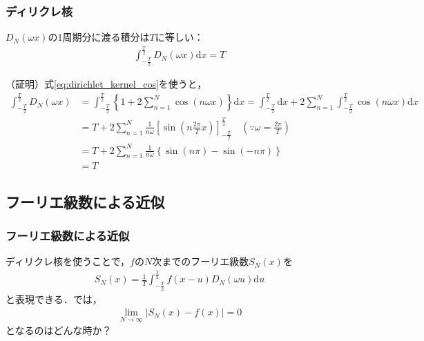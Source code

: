 \documentclass[dvipdfmx,graphicx,14pt]{beamer}
\begin{document}
\begin{frame}[c]
    \frametitle{ディリクレ核}
    \begin{block}{}
        $D_{N}(\omega x)$の1周期分に渡る積分は$T$に等しい：
        \begin{align}
            \int_{-\frac{T}{2}}^{\frac{T}{2}} D_{N}(\omega x) \mathrm{d} x = T \label{eq:dirichlet_kernel_int_period}
        \end{align}
    \end{block}
    \scriptsize
    （証明）式\eqref{eq:dirichlet_kernel_cos}を使うと，
    \begin{align*}
        \int_{-\frac{T}{2}}^{\frac{T}{2}} D_{N}(\omega x) &= \int_{-\frac{T}{2}}^{\frac{T}{2}} \left\{ 1 + 2 \sum_{n = 1}^{N} \cos(n\omega x) \right\} \mathrm{d} x = \int_{-\frac{T}{2}}^{\frac{T}{2}} \mathrm{d} x + 2 \sum_{n = 1}^{N} \int_{-\frac{T}{2}}^{\frac{T}{2}} \cos(n\omega x) \mathrm{d} x \\
        &= T + 2 \sum_{n = 1}^{N} \frac{1}{n\omega} \left[ \sin\left(n\frac{2\pi}{T} x\right) \right]_{-\frac{T}{2}}^{\frac{T}{2}} \quad \left(\because \omega = \frac{2\pi}{T}\right) \\
        &= T + 2 \sum_{n = 1}^{N} \frac{1}{n\omega} \left\{ \sin(n \pi) - \sin(-n \pi) \right\} \\
        &= T
    \end{align*}
\end{frame}

\subsection{フーリエ級数による近似}

\begin{frame}[c]
    \frametitle{フーリエ級数による近似}
    ディリクレ核を使うことで，$f$の$N$次までのフーリエ級数$S_{N}(x)$を
    \begin{align}
        S_{N}(x) = \frac{1}{T} \int_{-\frac{T}{2}}^{\frac{T}{2}} f(x-u) D_{N}(\omega u) \mathrm{d} u \label{eq:fourior_series_expansion}
    \end{align}
    と表現できる．では，
    \begin{align}
        \lim_{N \to \infty} |S_{N}(x) - f(x)| = 0 \label{eq:fourior_series_convergence}
    \end{align}
    となるのはどんな時か？
\end{frame}
\end{document}
